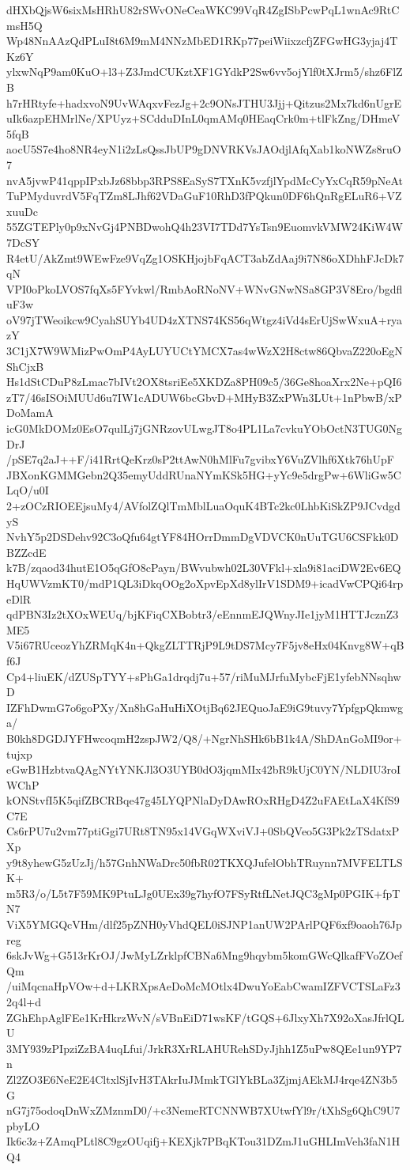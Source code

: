 dHXbQjsW6sixMsHRhU82rSWvONeCeaWKC99VqR4ZgISbPcwPqL1wnAc9RtCmsH5Q
Wp48NnAAzQdPLuI8t6M9mM4NNzMbED1RKp77peiWiixzcfjZFGwHG3yjaj4TKz6Y
ylxwNqP9am0KuO+l3+Z3JmdCUKztXF1GYdkP2Sw6vv5ojYlf0tXJrm5/shz6FlZB
h7rHRtyfe+hadxvoN9UvWAqxvFezJg+2c9ONsJTHU3Jjj+Qitzus2Mx7kd6nUgrE
uIk6azpEHMrlNe/XPUyz+SCdduDInL0qmAMq0HEaqCrk0m+tlFkZng/DHmeV5fqB
aocU5S7e4ho8NR4eyN1i2zLsQssJbUP9gDNVRKVsJAOdjlAfqXab1koNWZs8ruO7
nvA5jvwP41qppIPxbJz68bbp3RPS8EaSyS7TXnK5vzfjlYpdMcCyYxCqR59pNeAt
TuPMyduvrdV5FqTZm8LJhf62VDaGuF10RhD3fPQkun0DF6hQnRgELuR6+VZxuuDc
55ZGTEPly0p9xNvGj4PNBDwohQ4h23VI7TDd7YsTsn9EuomvkVMW24KiW4W7DcSY
R4etU/AkZmt9WEwFze9VqZg1OSKHjojbFqACT3abZdAaj9i7N86oXDhhFJcDk7qN
VPI0oPkoLVOS7fqXs5FYvkwl/RmbAoRNoNV+WNvGNwNSa8GP3V8Ero/bgdfluF3w
oV97jTWeoikcw9CyahSUYb4UD4zXTNS74KS56qWtgz4iVd4sErUjSwWxuA+ryazY
3C1jX7W9WMizPwOmP4AyLUYUCtYMCX7as4wWzX2H8ctw86QbvaZ220oEgNShCjxB
Hs1dStCDuP8zLmac7bIVt2OX8tsriEe5XKDZa8PH09c5/36Ge8hoaXrx2Ne+pQI6
zT7/46sISOiMUUd6u7IW1cADUW6bcGbvD+MHyB3ZxPWn3LUt+1nPbwB/xPDoMamA
icG0MkDOMz0EsO7qulLj7jGNRzovULwgJT8o4PL1La7cvkuYObOctN3TUG0NgDrJ
/pSE7q2aJ++F/i41RrtQeKrz0sP2ttAwN0hMlFu7gvibxY6VuZVlhf6Xtk76hUpF
JBXonKGMMGebn2Q35emyUddRUnaNYmKSk5HG+yYc9e5drgPw+6WliGw5CLqO/u0I
2+zOCzRIOEEjsuMy4/AVfolZQlTmMblLuaOquK4BTc2kc0LhbKiSkZP9JCvdgdyS
NvhY5p2DSDehv92C3oQfu64gtYF84HOrrDmmDgVDVCK0nUuTGU6CSFkk0DBZZcdE
k7B/zqaod34hutE1O5qGfO8cPayn/BWvubwh02L30VFkl+xla9i81aciDW2Ev6EQ
HqUWVzmKT0/mdP1QL3iDkqOOg2oXpvEpXd8ylIrV1SDM9+icadVwCPQi64rpeDlR
qdPBN3Iz2tXOxWEUq/bjKFiqCXBobtr3/eEnnmEJQWnyJIe1jyM1HTTJcznZ3ME5
V5i67RUceozYhZRMqK4n+QkgZLTTRjP9L9tDS7Mcy7F5jv8eHx04Knvg8W+qBf6J
Cp4+liuEK/dZUSpTYY+sPhGa1drqdj7u+57/riMuMJrfuMybcFjE1yfebNNsqhwD
IZFhDwmG7o6goPXy/Xn8hGaHuHiXOtjBq62JEQuoJaE9iG9tuvy7YpfgpQkmwga/
B0kh8DGDJYFHwcoqmH2zspJW2/Q8/+NgrNhSHk6bB1k4A/ShDAnGoMI9or+tujxp
eGwB1HzbtvaQAgNYtYNKJl3O3UYB0dO3jqmMIx42bR9kUjC0YN/NLDIU3roIWChP
kONStvfI5K5qifZBCRBqe47g45LYQPNlaDyDAwROxRHgD4Z2uFAEtLaX4KfS9C7E
Cs6rPU7u2vm77ptiGgi7URt8TN95x14VGqWXviVJ+0SbQVeo5G3Pk2zTSdatxPXp
y9t8yhewG5zUzJj/h57GnhNWaDrc50fbR02TKXQJufelObhTRuynn7MVFELTLSK+
m5R3/o/L5t7F59MK9PtuLJg0UEx39g7hyfO7FSyRtfLNetJQC3gMp0PGIK+fpTN7
ViX5YMGQcVHm/dlf25pZNH0yVhdQEL0iSJNP1anUW2PArlPQF6xf9oaoh76Jpreg
6skJvWg+G513rKrOJ/JwMyLZrklpfCBNa6Mng9hqybm5komGWcQlkafFVoZOefQm
/uiMqcnaHpVOw+d+LKRXpsAeDoMcMOtlx4DwuYoEabCwamIZFVCTSLaFz32q4l+d
ZGhEhpAglFEe1KrHkrzWvN/sVBnEiD71wsKF/tGQS+6JlxyXh7X92oXasJfrlQLU
3MY939zPIpziZzBA4uqLfui/JrkR3XrRLAHURehSDyJjhh1Z5uPw8QEe1un9YP7n
Zl2ZO3E6NeE2E4CltxlSjIvH3TAkrIuJMmkTGlYkBLa3ZjmjAEkMJ4rqe4ZN3b5G
nG7j75odoqDnWxZMznmD0/+c3NemeRTCNNWB7XUtwfYl9r/tXhSg6QhC9U7pbyLO
Ik6c3z+ZAmqPLtl8C9gzOUqifj+KEXjk7PBqKTou31DZmJ1uGHLImVeh3faN1HQ4
